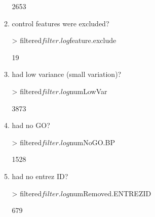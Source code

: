 \documentclass[letterpaper,12pt]{article}
\begin{document}
\begin{itemize}
\begin{enumerate}
\begin{Schunk}
\begin{Soutput}
[1] 2653
\end{Soutput}
\end{Schunk}
  \item control features were excluded?
\begin{Schunk}
\begin{Sinput}
> filtered$filter.log$feature.exclude
\end{Sinput}
\begin{Soutput}
[1] 19
\end{Soutput}
\end{Schunk}
  \item had low variance (small variation)?
\begin{Schunk}
\begin{Sinput}
> filtered$filter.log$numLowVar
\end{Sinput}
\begin{Soutput}
[1] 3873
\end{Soutput}
\end{Schunk}
  \item had no GO?
\begin{Schunk}
\begin{Sinput}
> filtered$filter.log$numNoGO.BP
\end{Sinput}
\begin{Soutput}
[1] 1528
\end{Soutput}
\end{Schunk}
  \item had no entrez ID?
\begin{Schunk}
\begin{Sinput}
> filtered$filter.log$numRemoved.ENTREZID
\end{Sinput}
\begin{Soutput}
[1] 679
\end{Soutput}
\end{Schunk}
  \end{enumerate}
  \end{itemize}
\end{document}
